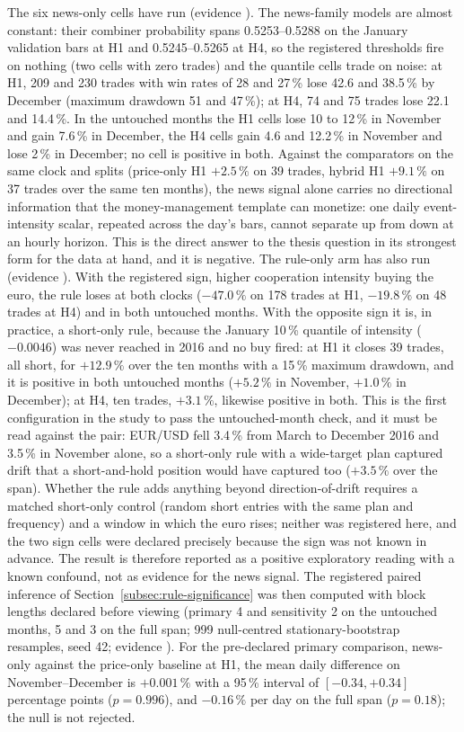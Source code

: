 The six news-only cells have run (evidence ). The news-family models are almost constant: their combiner probability spans 0.5253--0.5288 on the January validation bars at H1 and 0.5245--0.5265 at H4, so the registered thresholds fire on nothing (two cells with zero trades) and the quantile cells trade on noise: at H1, 209 and 230 trades with win rates of 28 and 27\,\% lose 42.6 and 38.5\,\% by December (maximum drawdown 51 and 47\,\%); at H4, 74 and 75 trades lose 22.1 and 14.4\,\%. In the untouched months the H1 cells lose 10 to 12\,\% in November and gain 7.6\,\% in December, the H4 cells gain 4.6 and 12.2\,\% in November and lose 2\,\% in December; no cell is positive in both. Against the comparators on the same clock and splits (price-only H1 $+2.5\,\%$ on 39 trades, hybrid H1 $+9.1\,\%$ on 37 trades over the same ten months), the news signal alone carries no directional information that the money-management template can monetize: one daily event-intensity scalar, repeated across the day's bars, cannot separate up from down at an hourly horizon. This is the direct answer to the thesis question in its strongest form for the data at hand, and it is negative. The rule-only arm has also run (evidence ). With the registered sign, higher cooperation intensity buying the euro, the rule loses at both clocks ($-47.0\,\%$ on 178 trades at H1, $-19.8\,\%$ on 48 trades at H4) and in both untouched months. With the opposite sign it is, in practice, a short-only rule, because the January 10\,\% quantile of intensity ($-0.0046$) was never reached in 2016 and no buy fired: at H1 it closes 39 trades, all short, for $+12.9\,\%$ over the ten months with a 15\,\% maximum drawdown, and it is positive in both untouched months ($+5.2\,\%$ in November, $+1.0\,\%$ in December); at H4, ten trades, $+3.1\,\%$, likewise positive in both. This is the first configuration in the study to pass the untouched-month check, and it must be read against the pair: EUR/USD fell 3.4\,\% from March to December 2016 and 3.5\,\% in November alone, so a short-only rule with a wide-target plan captured drift that a short-and-hold position would have captured too ($+3.5\,\%$ over the span). Whether the rule adds anything beyond direction-of-drift requires a matched short-only control (random short entries with the same plan and frequency) and a window in which the euro rises; neither was registered here, and the two sign cells were declared precisely because the sign was not known in advance. The result is therefore reported as a positive exploratory reading with a known confound, not as evidence for the news signal. The registered paired inference of Section~\ref{subsec:rule-significance} was then computed with block lengths declared before viewing (primary 4 and sensitivity 2 on the untouched months, 5 and 3 on the full span; 999 null-centred stationary-bootstrap resamples, seed 42; evidence ). For the pre-declared primary comparison, news-only against the price-only baseline at H1, the mean daily difference on November--December is $+0.001\,\%$ with a 95\,\% interval of $[-0.34, +0.34]$ percentage points ($p = 0.996$), and $-0.16\,\%$ per day on the full span ($p = 0.18$); the null is not rejected. 